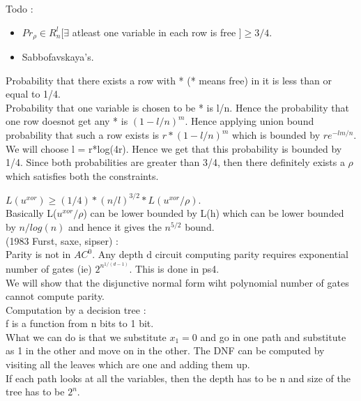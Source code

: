\documentclass[solution,addpoints,12pt]{exam}
\begin{document}
Todo :\\
\begin{itemize}
\item $Pr_\rho \in R_{n}^{l}[\exists$ atleast one variable in each row is free $ ] \ge 3/4$.
\item Sabbofavskaya's.
\end{itemize}


Probability that there exists a row with * (* means free) in it is less than or equal
to 1/4.\\
Probability that one variable is chosen to be * is l/n. Hence the
probability that one row doesnot get any * is ${(1 - l/n)}^m$. Hence applying
union bound probability that such a row exists is $r*{(1 - l/n)}^m$ which
is bounded by $re^{-lm/n}$. We will choose l = r*log(4r). Hence we get that
this probability is bounded by 1/4. Since both probabilities are greater than
3/4, then there definitely exists a $\rho$ which satisfies both the constraints.

$L(u^{xor}) \ge (1/4)*{(n/l)}^{3/2}*L(u^{xor}/\rho)$.\\
Basically L($u^{xor}/\rho$) can be lower bounded by L(h) which can be lower bounded
by $n/log(n)$ and hence it gives the $n^{5/2}$ bound.\\

(1983 Furst, saxe, sipser) :\\
Parity is not in ${AC}^0$. Any depth d circuit computing parity requires
exponential number of gates (ie) $2^{n^{1/(d-1)}}$. This is done in ps4.\\

We will show that the disjunctive normal form wiht polynomial
number of gates cannot compute parity.\\

Computation by a decision tree :\\
f is a function from n bits to 1 bit.\\
What we can do is that we substitute $x_1 = 0$ and go in one path
and substitute as 1 in the other and move on in the other. The DNF
can be computed by visiting all the leaves which are one and adding them up.\\
If each path looks at all the variables, then the depth has to be n and
size of the tree has to be $2^n$.\\
\end{document}
